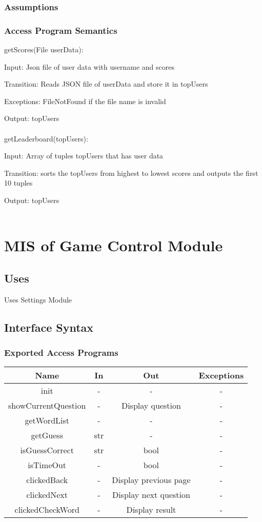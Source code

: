 \documentclass[12,english]{article}
\begin{document}
		\subsubsection{Assumptions}
		
		\subsubsection{Access Program Semantics}
		
		getScores(File userData): 
		
    	Input: Json file of user data with username and scores
    	
    	Transition: Reads JSON file of userData and store it in topUsers
    	
    	Exceptions: FileNotFound if the file name is invalid
    	
    	Output: topUsers\\
		\\
		getLeaderboard(topUsers):
		
		Input: Array of tuples topUsers that has user data

		Transition: sorts the topUsers from highest to lowest scores and outputs the first 10 tuples
		
		Output: topUsers\\
		\\
\section{MIS of Game Control Module}

\subsection{Uses}
Uses Settings Module
		\subsection{Interface Syntax}
		\subsubsection{Exported Access Programs}
		\begin{tabular}[pos]{|c|c|c|c|}
			
			\hline
			\textbf{Name}& \textbf{In} & \textbf{Out} & \textbf{Exceptions} \\ \hline
			init & - & - & -\\ \hline
			showCurrentQuestion & - & Display question & -\\ \hline
			getWordList & - & - & - \\ \hline
			getGuess & str & - & -\\ \hline
			isGuessCorrect & str & bool & -\\ \hline
			isTimeOut & - & bool & -\\ \hline
			clickedBack  & - & Display previous page & -\\ \hline
			clickedNext & - & Display next question  & -\\ \hline
			clickedCheckWord & - & Display result & -\\ \hline
			

		\end{tabular}
		
\end{document}
